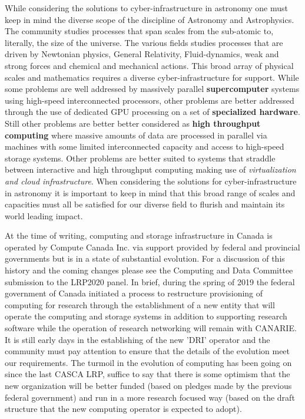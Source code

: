 \documentclass[11pt]{article}
\begin{document}
While considering the solutions to cyber-infrastructure in astronomy one must keep in mind the diverse scope of the discipline of Astronomy and Astrophysics. The community studies processes that span scales from the sub-atomic to, literally, the size of the universe.  
The various fields studies processes that are driven by Newtonian physics, General Relativity, Fluid-dynamics, weak and strong forces and chemical and mechanical actions. 
This broad array of physical scales and mathematics requires a diverse cyber-infrastructure for support.
While some problems are well addressed by massively parallel {\bf supercomputer} systems using high-speed interconnected processors, other problems are better addressed through the use of dedicated GPU processing on a set of {\bf specialized hardware}.  
Still other problems are better better considered as {\bf high throughput computing} where massive amounts of data are processed in parallel via machines with some limited interconnected capacity and access to high-speed storage systems.  
Other problems are better suited to systems that straddle between interactive and high throughput computing making use of {\em virtualization and cloud infrastructure}.
When considering the solutions for cyber-infrastructure in astronomy it is important to keep in mind that this broad range of scales and capacities must all be satisfied for our diverse field to flurish and maintain its world leading impact.

At the time of writing, computing and storage infrastructure in Canada is operated by Compute Canada Inc. via support provided by federal and provincial governments but is in a state of substantial evolution.  For a discussion of this history and the coming changes please see the Computing and Data Committee submission to the LRP2020 panel.  
In brief, during the spring of 2019 the federal government of Canada initiated a process to restructure provisioning of computing for research through the establishment of a new entity that will operate the computing and storage systems in addition to supporting research software while the operation of research networking will remain with CANARIE.  
It is still early days in the establishing of the new 'DRI' operator and the community must pay attention to ensure that the details of the evolution meet our requirements.  The turmoil in the evolution of computing has been going on since the last CASCA LRP, suffice to say that there is some optimism that the new organization will be better funded (based on pledges made by the previous federal government) and run in a more research focused way (based on the draft structure that the new computing operator is expected to adopt). 
\end{document}
